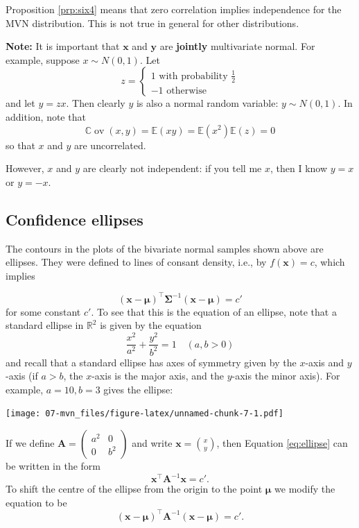 \documentclass[
]{book}
\theoremstyle{definition}
\theoremstyle{definition}
\theoremstyle{definition}
\theoremstyle{definition}
\theoremstyle{remark}
\begin{document}
Proposition \ref{prp:six4} means that zero correlation implies independence for the MVN distribution. This is not true in general for other distributions.

\textbf{Note:} It is important that \(\mathbf x\) and \(\mathbf y\) are \textbf{jointly} multivariate normal. For example, suppose \(x \sim N(0, 1)\). Let
\[z=\begin{cases}
1 \mbox{ with probability } \frac{1}{2}\\
-1 \mbox{ otherwise}
\end{cases}
\]
and let \(y=zx\). Then clearly \(y\) is also a normal random variable: \(y \sim N(0,1)\). In addition, note that
\[{\mathbb{C}\operatorname{ov}}(x,y)= {\mathbb{E}}(xy)= {\mathbb{E}}(x^2){\mathbb{E}}(z)=0\]
so that \(x\) and \(y\) are uncorrelated.

However, \(x\) and \(y\) are clearly not independent: if you tell me \(x\), then I know \(y=x\) or \(y=-x\).

\subsection{Confidence ellipses}\label{confidence-ellipses}

The contours in the plots of the bivariate normal samples shown above are ellipses.
They were defined to lines of consant density, i.e., by \(f(\mathbf x)=c\), which implies

\begin{equation}
(\mathbf x- {\boldsymbol{\mu}})^\top \boldsymbol{\Sigma}^{-1} (\mathbf x- {\boldsymbol{\mu}})=c' \label{eq:mvnellipse}
\end{equation}
for some constant \(c'\).
To see that this is the equation of an ellipse, note that a standard ellipse in \(\mathbb{R}^2\) is given by the equation
\begin{equation}
\frac{x^2}{a^2}+\frac{y^2}{b^2}=1 \quad (a, b>0) \label{eq:ellipse}
\end{equation}
and recall that a standard ellipse has axes of symmetry given by the \(x\)-axis and \(y\)-axis
(if \(a>b\), the \(x\)-axis is the major axis, and the \(y\)-axis the minor axis). For example, \(a=10, b=3\) gives the ellipse:

\texttt{[image: 07-mvn\_files/figure-latex/unnamed-chunk-7-1.pdf]}

If we define
\({\mathbf A}=\left(
\begin{array}{cc}
a^2&0\\
0&b^2
\end{array}
\right)\) and write \({\mathbf x}=\binom{x}{y}\),
then Equation \eqref{eq:ellipse} can be written in the form
\[ \mathbf x^\top {\mathbf A}^{-1}\mathbf x=c'. \]
To shift the centre of the ellipse from the origin to the point \({\boldsymbol{\mu}}\) we modify the equation to be
\[ (\mathbf x-{\boldsymbol{\mu}})^\top {\mathbf A}^{-1}(\mathbf x-{\boldsymbol{\mu}}) =c'.\]
\end{document}

